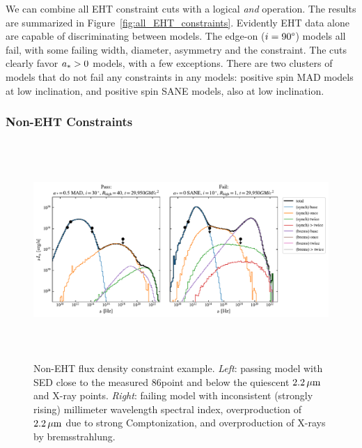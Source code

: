 
We can combine all EHT constraint cuts with a logical {\em and} operation.
The results are summarized in Figure~\ref{fig:all_EHT_constraints}.
Evidently EHT data alone are capable of discriminating between models.
The edge-on ($i = 90\degree$) models all fail, with some failing \mring width, diameter, asymmetry and the \vam  constraint.
The cuts clearly favor $a_* > 0$ models, with a few exceptions.
There are two clusters of models that do not fail any constraints in any models: positive spin MAD models at low inclination, and positive spin SANE models, also at low inclination.

\subsubsection{Non-EHT Constraints}

\begin{figure}[h!]
  \centering
  \includegraphics[height=3.25in]{figures/passfail_sed.pdf}
  \caption{%
    Non-EHT flux density constraint example.
    \emph{Left}: passing model with SED close to the measured 86\GHz point and below the quiescent $2.2\,\mu\mathrm{m}$ and X-ray points.
    \emph{Right}: failing model with inconsistent (strongly rising) millimeter wavelength spectral index, overproduction of $2.2\,\mu\mathrm{m}$ due to strong Comptonization, and overproduction of X-rays by bremsstrahlung.}
  \label{fig:passfail_sed}
\end{figure}

